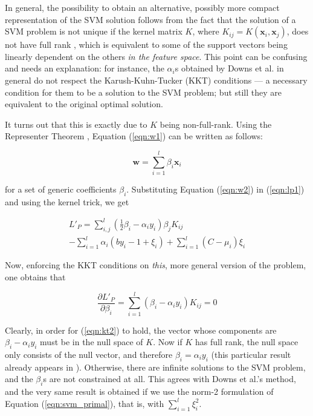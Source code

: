 \documentclass[10pt,twocolumn,letterpaper]{article}
\def\xx{\mathbf{x}}
\def\ww{\mathbf{w}}
\begin{document}
In general, the possibility to obtain an alternative, possibly more
compact representation of the SVM solution follows from the fact that
the solution of a SVM problem is not unique if the
kernel matrix $K$, where $K_{ij} = K(\xx_i,\xx_j)$, does not have full
rank \cite{Burges98}, which is equivalent to some of the support vectors being
linearly dependent on the others \emph{in the feature space}. This
point can be confusing and needs an explanation: for instance, the
$\alpha_i$s obtained by Downs et al. in general do not respect the
Karush-Kuhn-Tucker (KKT) conditions --- a necessary condition for them
to be a solution to the SVM problem; but still they are equivalent to
the original optimal solution.

It turns out that this is exactly due to $K$ being
non-full-rank. Using the Representer Theorem
\cite{CoxOS90,KimeldorfW70}, Equation (\ref{eqn:w1}) can be written as
follows:

\begin{equation} \label{eqn:w2}
  \ww = \sum_{i=1}^l \beta_i \xx_i
\end{equation}

for a set of generic coefficients $\beta_i$. Substituting Equation
(\ref{eqn:w2}) in (\ref{eqn:lp1}) and using the kernel trick, we get

\begin{eqnarray} \label{eqn:svm_primal_general}
  L'_P =   \sum_{i,j}^l \left( \frac{1}{2}\beta_i-\alpha_i y_i \right) \beta_j K_{ij} \\
         - \sum_{i=1}^l \alpha_i (b y_i -1 +\xi_i) + \sum_{i=1}^l (C - \mu_i) \xi_i \nonumber
\end{eqnarray}

Now, enforcing the KKT conditions on \emph{this}, more general version
of the problem, one obtains that

\begin{equation} \label{eqn:kt2}
  \frac{\partial L'_P}{\partial \beta_i} = \sum_{i=1}^l (\beta_i - \alpha_i y_i) K_{ij} = 0
\end{equation}

Clearly, in order for (\ref{eqn:kt2}) to hold, the vector whose
components are $\beta_i-\alpha_i y_i$ must be in the null space of
$K$. Now if $K$ has full rank, the null space only consists of the
null vector, and therefore $\beta_i = \alpha_i y_i$ (this particular
result already appears in \cite{KeerthiCDC06}). Otherwise, there are
infinite solutions to the SVM problem, and the $\beta_i$s are not
constrained at all. This agrees with Downs et al.'s method, and the
very same result is obtained if we use the norm-2 formulation of
Equation (\ref{eqn:svm_primal}), that is, with $\sum_{i=1}^l \xi_i^2$.
\end{document}
